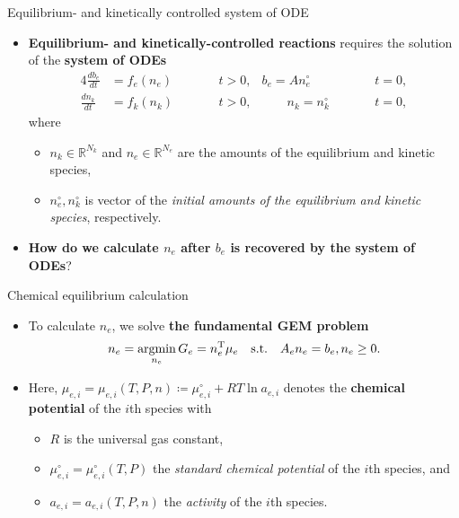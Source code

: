 \begin{frame}{Equilibrium- and kinetically controlled system of ODE}
	\begin{itemize}
		\item \alert{\bf Equilibrium- and kinetically-controlled reactions} requires the solution of the {\bf system of ODEs}
	\begin{alignat}{4}
		\frac{{d}b_{e}}{{d}t} & = f_e(n_{e}) & \qquad & t>0, & b_{e}=An_{e}^{\circ} & \qquad & t=0,\label{eq:kinetics}\\
		\frac{{d}n_{k}}{{d}t} & = f_k(n_{k}) &  & t>0, & \qquad n_{k}=n_{k}^{\circ} &  & t=0,\nonumber 
	\end{alignat}
	where 
	\begin{itemize}
		\item $n_{k}\in\mathbb{R}^{{N}_k}$ and $n_{e}\in\mathbb{R}^{{N}_e}$ are the amounts of the equilibrium and kinetic species,
		\item $n_{e}^{\circ}, n_{k}^{\circ}$ is vector of the \emph{initial amounts of the equilibrium and kinetic species}, respectively.
	\end{itemize}
	\pause
	\item \alert{\bf How do we calculate $n_{e}$ after  $b_e$ is recovered by the system of ODEs}? 
	\end{itemize}
\end{frame}
%
\begin{frame}{Chemical equilibrium calculation}
	\begin{itemize}
		\item To calculate $n_{e}$, we solve {\bf the fundamental GEM problem}
		\[
		n_e 
		= \mathop{\mathrm{argmin}}_{n_{e}} G_{e} 
		= n_{e}^{{\rm T}}\mu_{e} \quad\mbox{s.t.} 
		\quad A_{e}n_{e}=b_{e},n_{e}\geq0.\]
		\item Here, $\mu_{e,i} = \mu_{e,i}(T,P,n)\coloneqq\mu_{e,i}^{\circ}+RT\ln a_{e,i}$ denotes the {\bf chemical potential} of the $i$th species with 
		\begin{itemize}
		\item $R$ is the universal gas constant, 
		\item $\mu_{e,i}^{\circ}=\mu _{e,i}^{\circ}(T,P)$ the \emph{standard chemical potential} of the $i$th species, and
		\item $a_{e,i}=a_{e,i}(T,P,n)$ the \emph{activity} of the $i$th species.
		\end{itemize}
	\end{itemize}
\end{frame}
